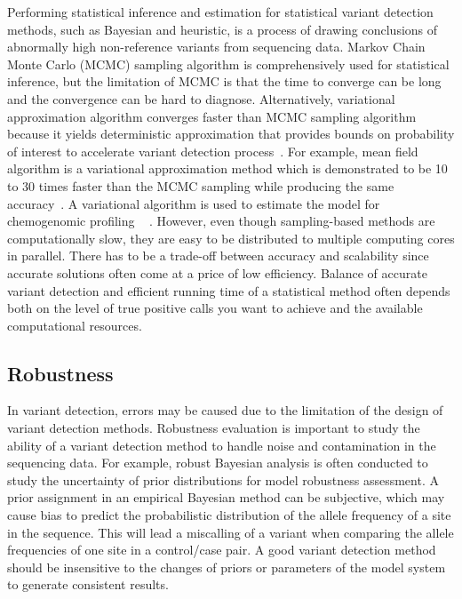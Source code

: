 \documentclass[a4,center,fleqn]{NAR}
\begin{document}
Performing statistical inference and estimation for statistical variant detection methods, such as Bayesian and heuristic, is a process of drawing conclusions of abnormally high non-reference variants from sequencing data. 
Markov Chain Monte Carlo (MCMC) sampling algorithm is comprehensively used for statistical inference, but the limitation of MCMC is that the time to converge can be long and the convergence can be hard to diagnose.
Alternatively, variational approximation algorithm converges faster than MCMC sampling algorithm because it yields deterministic approximation that provides bounds on probability of interest to accelerate variant detection process~\citep{jordan1999introduction}.
For example, mean field algorithm is a variational approximation method which is demonstrated to be 10 to 30 times faster than the MCMC sampling while producing the same accuracy~\citep{peterson1989explorations}.
A variational algorithm is used to estimate the model for chemogenomic profiling ~\citep{flaherty2005latent} .
However, even though sampling-based methods are computationally slow, they are easy to be distributed to multiple computing cores in parallel.
There has to be a trade-off between accuracy and scalability since accurate solutions often come at a price of low efficiency.
Balance of accurate variant detection and efficient running time of a statistical method often depends both on the level of true positive calls you want to achieve and the available computational resources.

\subsection{Robustness}

In variant detection, errors may be caused due to the limitation of the design of variant detection methods.
Robustness evaluation is important to study the ability of a variant detection method to handle noise and contamination in the sequencing data. 
For example, robust Bayesian analysis is often conducted to study the uncertainty of prior distributions for model robustness assessment.
A prior assignment in an empirical Bayesian method can be subjective, which may cause bias to predict the probabilistic distribution of the allele frequency of a site in the sequence.
This will lead a miscalling of a variant when comparing the allele frequencies of one site in a control/case pair.
A good variant detection method should be insensitive to the changes of priors or parameters of the model system to generate consistent results.
\end{document}
